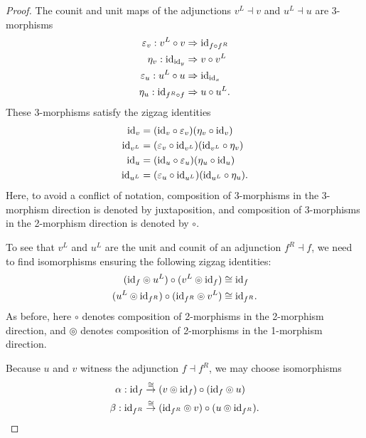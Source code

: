 \documentclass{amsart}
\begin{document}
\begin{proof}
The counit and unit maps of the adjunctions $v^L \dashv v$ and $u^L \dashv u$ are 3-morphisms
\begin{align*}
	\varepsilon_v: v^L \circ v & \Rightarrow \mathrm{id}_{f \circ f^R} \\
	\eta_v: \mathrm{id}_{\mathrm{id}_y} & \Rightarrow v \circ v^L \\
	\varepsilon_u: u^L \circ u & \Rightarrow \mathrm{id}_{\mathrm{id}_x} \\
	\eta_u: \mathrm{id}_{f^R \circ f} & \Rightarrow  u \circ u^L.
\end{align*}
These 3-morphisms satisfy the zigzag identities
\begin{align*}
	 \mathrm{id}_v  &= (\mathrm{id}_v \circ \varepsilon_v) (\eta_v \circ \mathrm{id}_v)  \\
	 \mathrm{id}_{v^L}  &= (\varepsilon_v \circ \mathrm{id}_{v^L} ) (\mathrm{id}_{v^L} \circ \eta_v)  \\
	 \mathrm{id}_u  &= (\mathrm{id}_u \circ \varepsilon_u) (\eta_u \circ \mathrm{id}_u)  \\
	 \mathrm{id}_{u^L}  &= (\varepsilon_u \circ \mathrm{id}_{u^L} ) (\mathrm{id}_{u^L} \circ \eta_u).  
\end{align*}
Here, to avoid a conflict of notation, composition of 3-morphisms in the 3-morphism direction is denoted by juxtaposition, and composition of 3-morphisms in the 2-morphism direction is denoted by $\circ$.

To see that $v^L$ and $u^L$ are the unit and counit of an adjunction $f^R \dashv f$, we need to find isomorphisms ensuring the following zigzag identities:
\begin{align*}
	 (\mathrm{id}_{f} \circledcirc u^L) \circ (v^L \circledcirc \mathrm{id}_{f} ) & \cong \mathrm{id}_{f} \\
 	 (u^L \circledcirc \mathrm{id}_{f^R}) \circ (\mathrm{id}_{f^R} \circledcirc v^L) & \cong \mathrm{id}_{f^R}. 
\end{align*}
As before, here $\circ$ denotes composition of 2-morphisms in the 2-morphism direction, and $\circledcirc$ denotes composition of 2-morphisms in the 1-morphism direction.

Because $u$ and $v$ witness the adjunction $f \dashv f^R$, we may choose isomorphisms
\begin{align*}
	\alpha: \mathrm{id}_f &\stackrel{\cong}{\to} (v \circledcirc \mathrm{id}_f) \circ (\mathrm{id}_f \circledcirc u) \\
	\beta: \mathrm{id}_{f^R} &\stackrel{\cong}{\to} (\mathrm{id}_{f^R} \circledcirc v) \circ (u \circledcirc \mathrm{id}_{f^R} ).
\end{align*}


\end{proof}
\end{document}

